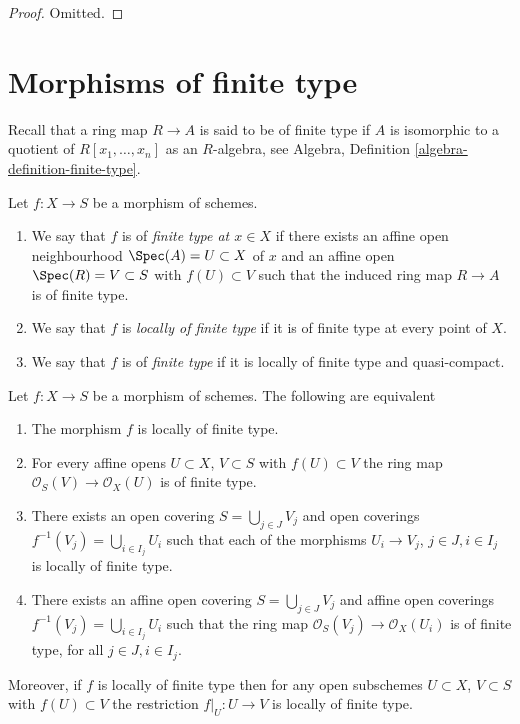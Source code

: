 \begin{proof}
Omitted.
\end{proof}








\section{Morphisms of finite type}
\label{section-finite-type}

\noindent
Recall that a ring map $R \to A$ is said to be of finite type if
$A$ is isomorphic to a quotient of $R[x_1, \ldots, x_n]$ as an $R$-algebra, see
Algebra, Definition \ref{algebra-definition-finite-type}.

\begin{definition}
\label{definition-finite-type}
Let $f : X \to S$ be a morphism of schemes.
\begin{enumerate}
\item We say that $f$ is of {\it finite type at $x \in X$} if
there exists an affine open neighbourhood $\Spec(A) = U \subset X$
of $x$ and an affine open $\Spec(R) = V \subset S$
with $f(U) \subset V$ such that the induced ring map
$R \to A$ is of finite type.
\item We say that $f$ is {\it locally of finite type} if it is
of finite type at every point of $X$.
\item We say that $f$ is of {\it finite type} if it is locally of
finite type and quasi-compact.
\end{enumerate}
\end{definition}

\begin{lemma}
\label{lemma-locally-finite-type-characterize}
Let $f : X \to S$ be a morphism of schemes.
The following are equivalent
\begin{enumerate}
\item The morphism $f$ is locally of finite type.
\item For every affine opens $U \subset X$, $V \subset S$
with $f(U) \subset V$ the ring map
$\mathcal{O}_S(V) \to \mathcal{O}_X(U)$ is of finite type.
\item There exists an open covering $S = \bigcup_{j \in J} V_j$
and open coverings $f^{-1}(V_j) = \bigcup_{i \in I_j} U_i$ such
that each of the morphisms $U_i \to V_j$, $j\in J, i\in I_j$
is locally of finite type.
\item There exists an affine open covering $S = \bigcup_{j \in J} V_j$
and affine open coverings $f^{-1}(V_j) = \bigcup_{i \in I_j} U_i$ such
that the ring map $\mathcal{O}_S(V_j) \to \mathcal{O}_X(U_i)$ is
of finite type, for all $j\in J, i\in I_j$.
\end{enumerate}
Moreover, if $f$ is locally of finite type then for
any open subschemes $U \subset X$, $V \subset S$ with $f(U) \subset V$
the restriction $f|_U : U \to V$ is locally of finite type.
\end{lemma}

